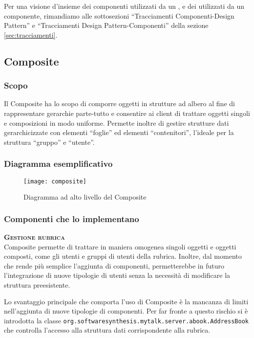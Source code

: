 Per una visione d'insieme dei componenti utilizzati da un , e dei  utilizzati da un componente, rimandiamo alle sottosezioni ``Tracciamenti Componenti-Design Pattern'' e ``Tracciamenti Design Pattern-Componenti'' della sezione \vref{sec:tracciamenti}.

\subsection{Composite}

\subsubsection{Scopo}
Il  Composite ha lo scopo di comporre oggetti in strutture ad albero al fine di rappresentare gerarchie parte-tutto e consentire ai client di trattare oggetti singoli e composizioni in modo uniforme. Permette inoltre di gestire strutture dati gerarchicizzate con elementi ``foglie'' ed elementi ``contenitori'', l'ideale per la struttura ``gruppo'' e ``utente''.

\subsubsection{Diagramma esemplificativo}
\begin{figure}[H]
\centering
\texttt{[image: composite]}
\caption{Diagramma ad alto livello del  Composite}\label{fig:composite}
\end{figure}

\subsubsection{Componenti che lo implementano}
\begin{description}
\item{\bfseries\scshape Gestione rubrica}\\
Composite permette di trattare in maniera omogenea singoli oggetti e oggetti composti, come gli utenti e gruppi di utenti della rubrica. Inoltre, dal momento che rende più semplice l'aggiunta di componenti, permetterebbe in futuro l'integrazione di nuove tipologie di utenti senza la necessità di modificare la struttura preesistente.

Lo svantaggio principale che comporta l'uso di Composite è la mancanza di limiti nell'aggiunta di nuove tipologie di componenti. Per far fronte a questo rischio si è introdotta la classe \texttt{org.softwaresynthesis.mytalk.server.abook.AddressBook} che controlla l'accesso alla struttura dati corrispondente alla rubrica.
\end{description}

